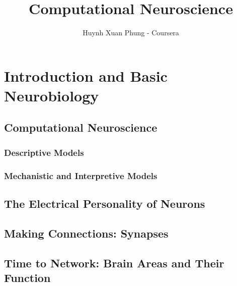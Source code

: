 \documentclass{book}
\title{Computational Neuroscience}
\author{Huynh Xuan Phung - Coursera}
\date{ }
\begin{document}
 
\maketitle
 
\tableofcontents

\chapter{Introduction and Basic Neurobiology}

\section{Computational Neuroscience}
\subsection{Descriptive Models}
\subsection{Mechanistic and Interpretive Models}

\section{The Electrical Personality of Neurons}

\section{Making Connections: Synapses}

\section{Time to Network: Brain Areas and Their Function}

 

 
\end{document}
